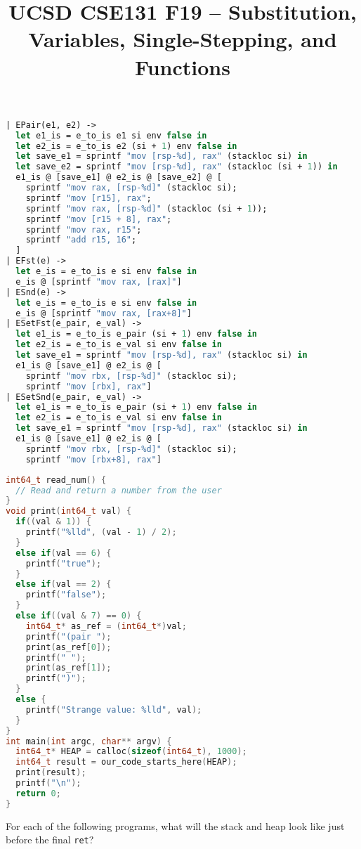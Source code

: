 \documentclass[10pt, oneside]{article}
\title{UCSD CSE131 F19 -- Substitution, Variables, Single-Stepping, and Functions}
\begin{document}
\begin{minipage}{.6\textwidth}
\begin{lstlisting}[language=ml]
| EPair(e1, e2) ->
  let e1_is = e_to_is e1 si env false in
  let e2_is = e_to_is e2 (si + 1) env false in
  let save_e1 = sprintf "mov [rsp-%d], rax" (stackloc si) in
  let save_e2 = sprintf "mov [rsp-%d], rax" (stackloc (si + 1)) in
  e1_is @ [save_e1] @ e2_is @ [save_e2] @ [
    sprintf "mov rax, [rsp-%d]" (stackloc si);
    sprintf "mov [r15], rax";
    sprintf "mov rax, [rsp-%d]" (stackloc (si + 1));
    sprintf "mov [r15 + 8], rax";
    sprintf "mov rax, r15";
    sprintf "add r15, 16";
  ]
| EFst(e) ->
  let e_is = e_to_is e si env false in
  e_is @ [sprintf "mov rax, [rax]"]
| ESnd(e) ->
  let e_is = e_to_is e si env false in
  e_is @ [sprintf "mov rax, [rax+8]"]
| ESetFst(e_pair, e_val) ->
  let e1_is = e_to_is e_pair (si + 1) env false in
  let e2_is = e_to_is e_val si env false in
  let save_e1 = sprintf "mov [rsp-%d], rax" (stackloc si) in
  e1_is @ [save_e1] @ e2_is @ [
    sprintf "mov rbx, [rsp-%d]" (stackloc si);
    sprintf "mov [rbx], rax"]
| ESetSnd(e_pair, e_val) ->
  let e1_is = e_to_is e_pair (si + 1) env false in
  let e2_is = e_to_is e_val si env false in
  let save_e1 = sprintf "mov [rsp-%d], rax" (stackloc si) in
  e1_is @ [save_e1] @ e2_is @ [
    sprintf "mov rbx, [rsp-%d]" (stackloc si);
    sprintf "mov [rbx+8], rax"]
\end{lstlisting}
\end{minipage}
\begin{minipage}{.4\textwidth}
\begin{lstlisting}[language=c]
int64_t read_num() {
  // Read and return a number from the user
}
void print(int64_t val) {
  if((val & 1)) {
    printf("%lld", (val - 1) / 2);
  }
  else if(val == 6) {
    printf("true");
  }
  else if(val == 2) {
    printf("false");
  }
  else if((val & 7) == 0) {
    int64_t* as_ref = (int64_t*)val;
    printf("(pair ");
    print(as_ref[0]);
    printf(" ");
    print(as_ref[1]);
    printf(")");
  }
  else {
    printf("Strange value: %lld", val);
  }
}
int main(int argc, char** argv) {
  int64_t* HEAP = calloc(sizeof(int64_t), 1000);
  int64_t result = our_code_starts_here(HEAP);
  print(result);
  printf("\n");
  return 0;
}
\end{lstlisting}
\end{minipage}

For each of the following programs, what will the stack and heap look like
just before the final {\tt ret}?
\end{document}
